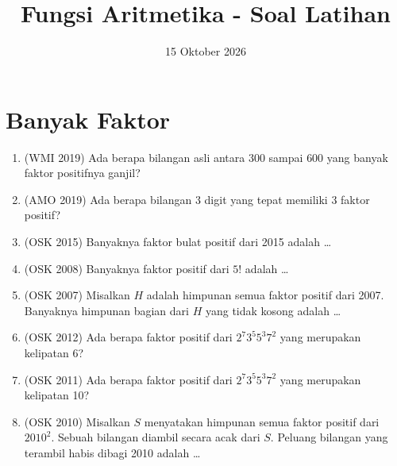 \documentclass[12pt]{scrartcl}
\title{Fungsi Aritmetika - Soal Latihan}
\date{15 Oktober 2026}
\begin{document}
\maketitle

\renewcommand*\contentsname{Daftar Isi}
\tableofcontents

\newpage

\section{Banyak Faktor}

\begin{enumerate}

	\item (WMI 2019)
	Ada berapa bilangan asli antara $300$ sampai $600$ yang banyak faktor
	positifnya ganjil?

	\item (AMO 2019)
	Ada berapa bilangan $3$ digit yang tepat memiliki $3$ faktor positif?

	\item (OSK 2015)
	Banyaknya faktor bulat positif dari 2015 adalah \dots

	\item (OSK 2008)
	Banyaknya faktor positif dari $5!$ adalah \dots

	\item (OSK 2007)
	Misalkan $H$ adalah himpunan semua faktor positif dari 2007.
	Banyaknya himpunan bagian dari $H$ yang tidak kosong adalah \dots

	\item (OSK 2012)
	Ada berapa faktor positif dari $2^{7}3^{5}5^{3}7^{2}$
	yang merupakan kelipatan 6?

	\item (OSK 2011)
	Ada berapa faktor positif dari $2^{7}3^{5}5^{3}7^{2}$
	yang merupakan kelipatan 10?

	\item (OSK 2010)
	Misalkan $S$ menyatakan himpunan semua faktor positif dari $2010^{2}$.
	Sebuah bilangan diambil secara acak dari $S$.
	Peluang bilangan yang terambil habis dibagi 2010 adalah \dots


\end{enumerate}
\end{document}
